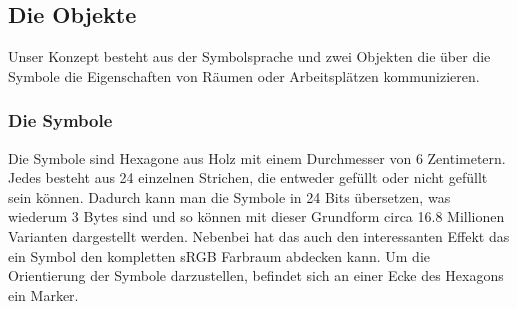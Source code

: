 \documentclass{article}
\begin{document}

\newpage

\subsection{Die Objekte}
Unser Konzept besteht aus der Symbolsprache und zwei Objekten die über die Symbole die Eigenschaften von Räumen oder Arbeitsplätzen kommunizieren.

\subsubsection*{Die Symbole}
Die Symbole sind Hexagone aus Holz mit einem Durchmesser von 6 Zentimetern. Jedes besteht aus 24 einzelnen Strichen, die entweder gefüllt oder nicht gefüllt sein können. Dadurch kann man die Symbole in 24 Bits übersetzen, was wiederum 3 Bytes sind und so können mit dieser Grundform circa 16.8 Millionen Varianten dargestellt werden. Nebenbei hat das auch den interessanten Effekt das ein Symbol den kompletten sRGB Farbraum abdecken kann. Um die Orientierung der Symbole darzustellen, befindet sich an einer Ecke des Hexagons ein Marker.
\end{document}
